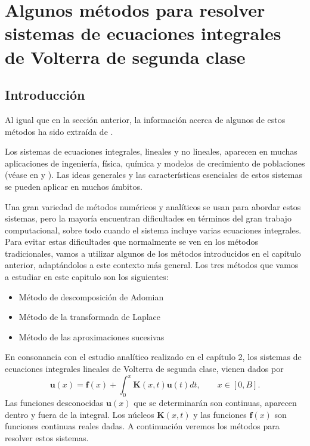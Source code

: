 \chapter{Algunos métodos para resolver sistemas de ecuaciones integrales de Volterra de segunda clase}
\section{Introducción}
Al igual que en la sección anterior, la información acerca de algunos de estos métodos ha sido extraída de \cite{WazWaz}.

Los sistemas de ecuaciones integrales, lineales y no lineales, aparecen en muchas aplicaciones de ingeniería, física, química y modelos de crecimiento de poblaciones (véase en \cite{sistemas1} y \cite{sistemas2}). Las ideas generales y las características esenciales de estos sistemas se pueden aplicar en muchos ámbitos.

Una gran variedad de métodos numéricos y analíticos se usan para abordar estos sistemas, pero la mayoría encuentran dificultades en términos del gran trabajo computacional, sobre todo cuando el sistema incluye varias ecuaciones integrales. Para evitar estas dificultades que normalmente se ven en los métodos tradicionales, vamos a utilizar algunos de los métodos introducidos en el capítulo anterior, adaptándolos a este contexto más general. Los tres métodos que vamos a estudiar en este capitulo son los siguientes:
\begin{itemize}
	\item Método de descomposición de Adomian
	\item Método de la transformada de Laplace
	\item Método de las aproximaciones sucesivas
\end{itemize}

En consonancia con el estudio analítico realizado en el capítulo 2, los sistemas de ecuaciones integrales lineales de Volterra de segunda clase, vienen dados por
\begin{equation}
	\textbf{u}(x) = \textbf{f}(x) + \int_0^x \textbf{K}(x,t)\textbf{u}(t)dt, \qquad x \in [0,B].
\end{equation}
Las funciones desconocidas $\textbf{u}(x)$ que se determinarán son continuas, aparecen dentro y fuera de la integral. Los núcleos $\textbf{K}(x,t)$ y las funciones $\textbf{f}(x)$ son funciones continuas reales dadas. A continuación veremos los métodos para resolver estos sistemas.
